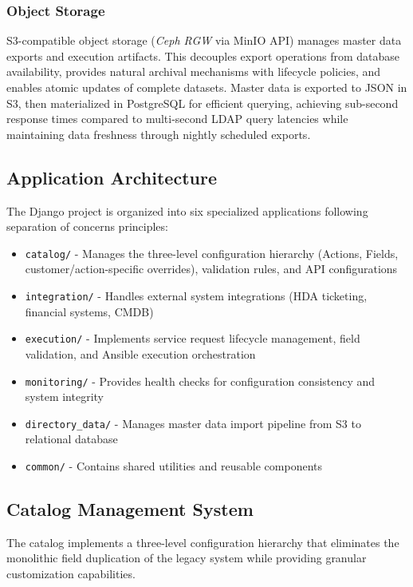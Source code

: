 \subsubsection{Object Storage}

S3-compatible object storage (\textit{Ceph RGW} via MinIO API) manages master data exports and execution artifacts. This decouples export operations from database availability, provides natural archival mechanisms with lifecycle policies, and enables atomic updates of complete datasets. Master data is exported to JSON in S3, then materialized in PostgreSQL for efficient querying, achieving sub-second response times compared to multi-second LDAP query latencies while maintaining data freshness through nightly scheduled exports.

\subsection{Application Architecture}

The Django project is organized into six specialized applications following separation of concerns principles:

\begin{itemize}
\item \texttt{catalog/} - Manages the three-level configuration hierarchy (Actions, Fields, customer/action-specific overrides), validation rules, and API configurations
\item \texttt{integration/} - Handles external system integrations (HDA ticketing, financial systems, CMDB)
\item \texttt{execution/} - Implements service request lifecycle management, field validation, and Ansible execution orchestration
\item \texttt{monitoring/} - Provides health checks for configuration consistency and system integrity
\item \texttt{directory\_data/} - Manages master data import pipeline from S3 to relational database
\item \texttt{common/} - Contains shared utilities and reusable components
\end{itemize}

\subsection{Catalog Management System}

The catalog implements a three-level configuration hierarchy that eliminates the monolithic field duplication of the legacy system while providing granular customization capabilities.

